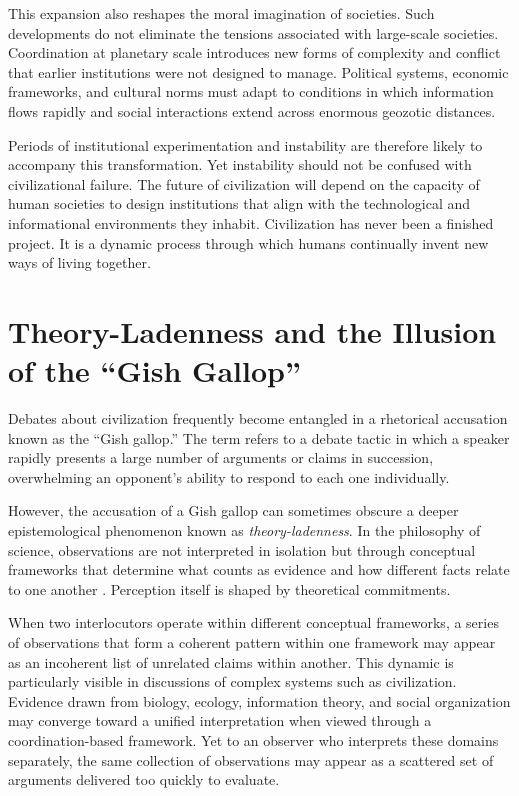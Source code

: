 \documentclass[12pt]{article}
\begin{document}
This expansion also reshapes the moral imagination of societies. Such developments do not eliminate the tensions associated with large-scale societies. Coordination at planetary scale introduces new forms of complexity and conflict that earlier institutions were not designed to manage. Political systems, economic frameworks, and cultural norms must adapt to conditions in which information flows rapidly and social interactions extend across enormous geozotic distances.

Periods of institutional experimentation and instability are therefore likely to accompany this transformation. Yet instability should not be confused with civilizational failure. The future of civilization will depend on the capacity of human societies to design institutions that align with the technological and informational environments they inhabit. Civilization has never been a finished project. It is a dynamic process through which humans continually invent new ways of living together.

\section{Theory-Ladenness and the Illusion of the ``Gish Gallop''}

Debates about civilization frequently become entangled in a rhetorical accusation known as the ``Gish gallop.'' The term refers to a debate tactic in which a speaker rapidly presents a large number of arguments or claims in succession, overwhelming an opponent's ability to respond to each one individually.

However, the accusation of a Gish gallop can sometimes obscure a deeper epistemological phenomenon known as \emph{theory-ladenness}. In the philosophy of science, observations are not interpreted in isolation but through conceptual frameworks that determine what counts as evidence and how different facts relate to one another \cite{hanson1958,kuhn1962}. Perception itself is shaped by theoretical commitments.

When two interlocutors operate within different conceptual frameworks, a series of observations that form a coherent pattern within one framework may appear as an incoherent list of unrelated claims within another. This dynamic is particularly visible in discussions of complex systems such as civilization. Evidence drawn from biology, ecology, information theory, and social organization may converge toward a unified interpretation when viewed through a coordination-based framework. Yet to an observer who interprets these domains separately, the same collection of observations may appear as a scattered set of arguments delivered too quickly to evaluate.
\end{document}
